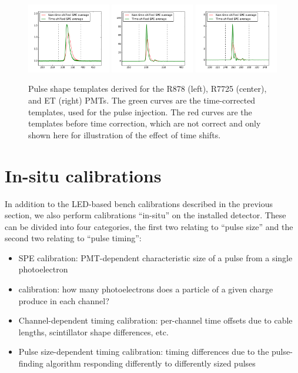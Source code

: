 {\begin{figure}[t]
  \begin{center}
    \includegraphics[width=0.325\textwidth]{figs/milliq/avg_spe_fixed_tcorr_878.pdf}
    \includegraphics[width=0.325\textwidth]{figs/milliq/avg_spe_fixed_tcorr_7725.pdf}
    \includegraphics[width=0.325\textwidth]{figs/milliq/avg_spe_fixed_tcorr_ET.pdf}
    \caption{Pulse shape templates derived for the R878 (left), R7725 (center), and ET (right) PMTs. The green curves
      are the time-corrected templates, used for the pulse injection. The red curves are the templates
      before time correction, which are not correct and only shown here for illustration of the effect
      of time shifts.
            }
    \label{fig:pulse_templates}
  \end{center}
\end{figure}

\section{In-situ calibrations}
\label{sec:insitu_calib}
In addition to the LED-based bench calibrations described in the previous section, we also
perform calibrations ``in-situ'' on the installed detector. These can be divided into four
categories, the first two relating to ``pulse size'' and the second two relating to
``pulse timing'':
\begin{itemize}\setlength\itemsep{-1mm}
\item SPE calibration: PMT-dependent characteristic size of a pulse from a single photoelectron
\item \Npe calibration: how many photoelectrons does a particle of a given charge produce in each channel?
\item Channel-dependent timing calibration: per-channel time offsets due to cable lengths, scintillator shape differences, etc.
\item Pulse size-dependent timing calibration: timing differences due to the pulse-finding algorithm responding differently 
to differently sized pulses
\end{itemize}

}
